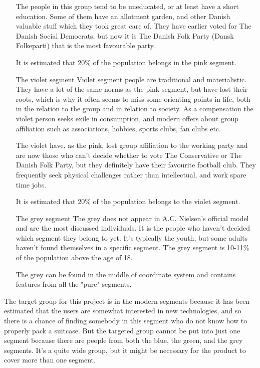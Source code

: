 \begin{itemize}
The people in this group tend to be uneducated, or at least have a short education. Some of them have an allotment garden, and other Danish valuable stuff which they took great care of. They have earlier voted for The Danish Social Democrats, but now it is The Danish Folk Party (Dansk Folkeparti) that is the most favourable party.

It is estimated that 20\% of the population belongs in the pink segment.

\item[The violet segment]
Violet segment people are traditional and materialistic. They have a lot of the same norms as the pink segment, but have lost their roots, which is why it often seems to miss some orienting points in life, both in the relation to the group and in relation to society. As a compensation the violet person seeks exile in consumption, and modern offers about group affiliation such as associations, hobbies, sports clubs, fan clubs etc. 

The violet have, as the pink, lost group affiliation to the working party and are now those who can't decide whether to vote The Conservative or The Danish Folk Party, but they definitely have their favourite football club. They frequently seek physical challenges rather than intellectual, and work spare time jobs.

It is estimated that 20\% of the population belongs to the violet segment.

\item[The grey segment]
The grey does not appear in A.C. Nielsen's official model and are the most discussed individuals. It is the people who haven't decided which segment they belong to yet. It's typically the youth, but some adults haven't found themselves in a specific segment. The grey segment is 10-11\% of the population above the age of 18.

The grey can be found in the middle of coordinate system and contains features from all the "pure" segments.
\end{itemize}
\citep{minerva}

The target group for this project is in the modern segments because it has been estimated that the users are somewhat interested in new technologies, and so there is a chance of finding somebody in this segment who do not know how to properly pack a suitcase. But the targeted group cannot be put into just one segment because there are people from both the blue, the green, and the grey segments. It's a quite wide group, but it might be necessary for the product to cover more than one segment.